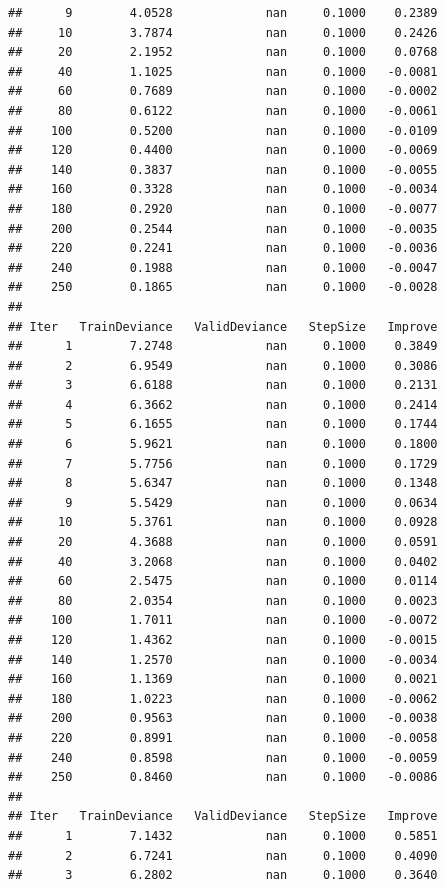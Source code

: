 \documentclass[
]{book}
\begin{document}
\begin{verbatim}
##      9        4.0528             nan     0.1000    0.2389
##     10        3.7874             nan     0.1000    0.2426
##     20        2.1952             nan     0.1000    0.0768
##     40        1.1025             nan     0.1000   -0.0081
##     60        0.7689             nan     0.1000   -0.0002
##     80        0.6122             nan     0.1000   -0.0061
##    100        0.5200             nan     0.1000   -0.0109
##    120        0.4400             nan     0.1000   -0.0069
##    140        0.3837             nan     0.1000   -0.0055
##    160        0.3328             nan     0.1000   -0.0034
##    180        0.2920             nan     0.1000   -0.0077
##    200        0.2544             nan     0.1000   -0.0035
##    220        0.2241             nan     0.1000   -0.0036
##    240        0.1988             nan     0.1000   -0.0047
##    250        0.1865             nan     0.1000   -0.0028
## 
## Iter   TrainDeviance   ValidDeviance   StepSize   Improve
##      1        7.2748             nan     0.1000    0.3849
##      2        6.9549             nan     0.1000    0.3086
##      3        6.6188             nan     0.1000    0.2131
##      4        6.3662             nan     0.1000    0.2414
##      5        6.1655             nan     0.1000    0.1744
##      6        5.9621             nan     0.1000    0.1800
##      7        5.7756             nan     0.1000    0.1729
##      8        5.6347             nan     0.1000    0.1348
##      9        5.5429             nan     0.1000    0.0634
##     10        5.3761             nan     0.1000    0.0928
##     20        4.3688             nan     0.1000    0.0591
##     40        3.2068             nan     0.1000    0.0402
##     60        2.5475             nan     0.1000    0.0114
##     80        2.0354             nan     0.1000    0.0023
##    100        1.7011             nan     0.1000   -0.0072
##    120        1.4362             nan     0.1000   -0.0015
##    140        1.2570             nan     0.1000   -0.0034
##    160        1.1369             nan     0.1000    0.0021
##    180        1.0223             nan     0.1000   -0.0062
##    200        0.9563             nan     0.1000   -0.0038
##    220        0.8991             nan     0.1000   -0.0058
##    240        0.8598             nan     0.1000   -0.0059
##    250        0.8460             nan     0.1000   -0.0086
## 
## Iter   TrainDeviance   ValidDeviance   StepSize   Improve
##      1        7.1432             nan     0.1000    0.5851
##      2        6.7241             nan     0.1000    0.4090
##      3        6.2802             nan     0.1000    0.3640

\end{verbatim}
\end{document}
